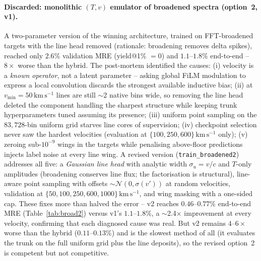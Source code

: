 \documentclass[11pt,a4paper]{article}
\newcommand{\kms}{\,\mathrm{km\,s^{-1}}}
\newcommand{\code}[1]{\texttt{#1}}
\begin{document}
\paragraph{Discarded: monolithic $(T,v)$ emulator of broadened spectra
(option~2, v1).} A two-parameter version of the winning architecture,
trained on FFT-broadened targets with the line head removed (rationale:
broadening removes delta spikes), reached only $2.6\%$ validation MRE
(yield@1\% $=0$) and $1.1$--$1.8\%$ end-to-end -- $8\times$ worse than
the hybrid. The post-mortem identified the causes: (i) velocity is a
\emph{known operator}, not a latent parameter -- asking global FiLM
modulation to express a local convolution discards the strongest
available inductive bias; (ii) at $v_{\min}=50\kms$ lines are still
$\sim$2 native bins wide, so removing the line head deleted the
component handling the sharpest structure while keeping trunk
hyperparameters tuned assuming its presence; (iii) uniform point
sampling on the $83{,}728$-bin uniform grid starves line cores of
supervision; (iv) checkpoint selection never saw the hardest velocities
(evaluation at $\{100,250,600\}\kms$ only); (v) zeroing sub-$10^{-9}$
wings in the targets while penalising above-floor predictions injects
label noise at every line wing. A revised version
(\code{train\_broadened2}) addresses all five: a \emph{Gaussian line
head} with analytic width $\sigma_u = v/c$ and $T$-only amplitudes
(broadening conserves line flux; the factorisation is structural),
line-aware point sampling with offsets $\sim\mathcal{N}(0,\sigma(v'))$
at random velocities, validation at $\{50,100,250,600,1000\}\kms$, and
wing masking with a one-sided cap. These fixes more than halved the
error -- v2 reaches $0.46$--$0.77\%$ end-to-end MRE
(Table~\ref{tab:broad2}) versus v1's $1.1$--$1.8\%$, a
$\sim$2.4$\times$ improvement at every velocity, confirming that each
diagnosed cause was real. But v2 remains $4$--$6\times$ worse than the
hybrid ($0.11$--$0.13\%$) and is the slowest method of all (it evaluates
the trunk on the full uniform grid plus the line deposits), so the
revised option~2 is competent but not competitive.
\end{document}
